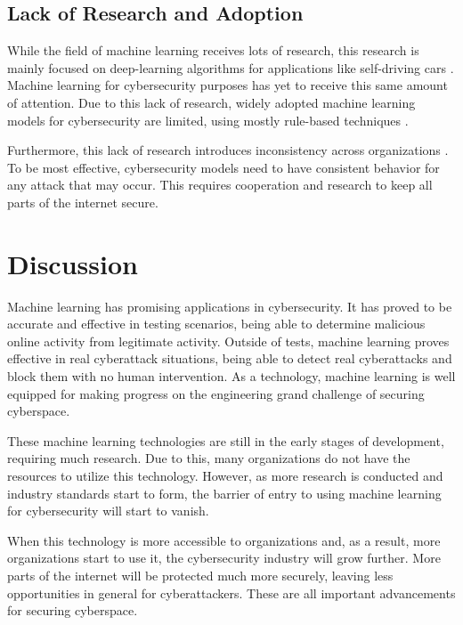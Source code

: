 \subsection{Lack of Research and Adoption}
While the field of machine learning receives lots of research, this research is mainly focused on deep-learning algorithms for applications like self-driving cars \cite{grandchallenge2019}.
Machine learning for cybersecurity purposes has yet to receive this same amount of attention.
Due to this lack of research, widely adopted machine learning models for cybersecurity are limited, using mostly rule-based techniques \cite{grandchallenge2019}.

Furthermore, this lack of research introduces inconsistency across organizations \cite{grandchallenge2019}.
To be most effective, cybersecurity models need to have consistent behavior for any attack that may occur.
This requires cooperation and research to keep all parts of the internet secure.

\section{Discussion}
Machine learning has promising applications in cybersecurity.
It has proved to be accurate and effective in testing scenarios, being able to determine malicious online activity from legitimate activity.
Outside of tests, machine learning proves effective in real cyberattack situations, being able to detect real cyberattacks and block them with no human intervention.
As a technology, machine learning is well equipped for making progress on the engineering grand challenge of securing cyberspace.

These machine learning technologies are still in the early stages of development, requiring much research.
Due to this, many organizations do not have the resources to utilize this technology.
However, as more research is conducted and industry standards start to form, the barrier of entry to using machine learning for cybersecurity will start to vanish.

When this technology is more accessible to organizations and, as a result, more organizations start to use it, the cybersecurity industry will grow further.
More parts of the internet will be protected much more securely, leaving less opportunities in general for cyberattackers.
These are all important advancements for securing cyberspace.
